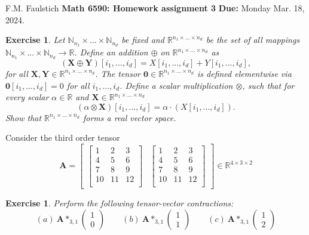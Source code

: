 \documentclass[11pt]{article}
\newcommand{\bgk}[1]{\boldsymbol{#1}}
\newcommand{\bzero}{\bgk{0}}
\newcommand{\bvec}[1]{\mathbf{#1}}
\newcommand{\vA}{\bvec{A}}
\newcommand{\vX}{\bvec{X}}
\newcommand{\vY}{\bvec{Y}}
\newtheorem{exercise}[theorem]{Exercise}
\begin{document}
\begin{flushleft}
F.M. Faulstich \hfill {\large\bf Math 6590: Homework assignment 3} \hfill {\bf Due:} Monday Mar. 18, 2024.\\
\end{flushleft}


\begin{exercise}
Let $\mathbb{N}_{n_1}\times ...  \times \mathbb{N}_{n_d}$ be fixed and 
$\mathbb{R}^{n_1 \times ... \times n_d}$
be the set of all mappings $\mathbb{N}_{n_1} \times ... \times \mathbb{N}_{n_d} \to \mathbb{R}$. 
Define an addition $\oplus$ on $\mathbb{R}^{n_1 \times ... \times n_d}$ as
$$
(\vX \oplus \vY)[i_1, . . . ,i_d] = X [i_1, . . . ,i_d] + Y[i_1, . . . ,i_d],
$$
for all $\vX ,\vY \in \mathbb{R}^{n_1 \times ... \times n_d}$.
The tensor $\bzero \in \mathbb{R}^{n_1 \times ... \times n_d}$ is defined elementwise via $\bzero [i_1, . . . ,i_d] = 0$  for all $i_1, . . . ,i_d$.
Define a scalar multiplication $\otimes$, such that for every
scalar $\alpha \in \mathbb{R}$ and $\vX \in \mathbb{R}^{n_1 \times ... \times n_d}$
$$
(\alpha \otimes  \vX )[i_1, . . . ,i_d] = \alpha \cdot (X [i_1, . . . ,i_d]) .
$$
Show that $\mathbb{R}^{n_1 \times ... \times n_d}$ forms a real vector space.
\end{exercise}

\noindent
Consider the third order tensor
$$
\vA = 
\begin{bmatrix}
\begin{bmatrix}
1 & 2 & 3 \\
4 & 5 & 6 \\
7 & 8 & 9 \\
10 & 11 & 12 \\
\end{bmatrix}
& \begin{bmatrix}
1 & 2 & 3 \\
4 & 5 & 6 \\
7 & 8 & 9 \\
10 & 11 & 12 \\
\end{bmatrix}
\end{bmatrix}
\in\mathbb{R}^{4\times 3\times 2}
$$

\begin{exercise}
Perform the following tensor-vector contractions:
$$
(a)~\vA *_{3,1} \begin{pmatrix}
1\\0
\end{pmatrix}
\qquad 
(b)~\vA *_{3,1} \begin{pmatrix}
1\\1
\end{pmatrix}
\qquad 
(c)~\vA *_{3,1} \begin{pmatrix}
1\\2
\end{pmatrix}
$$
\end{exercise}
\end{document}
